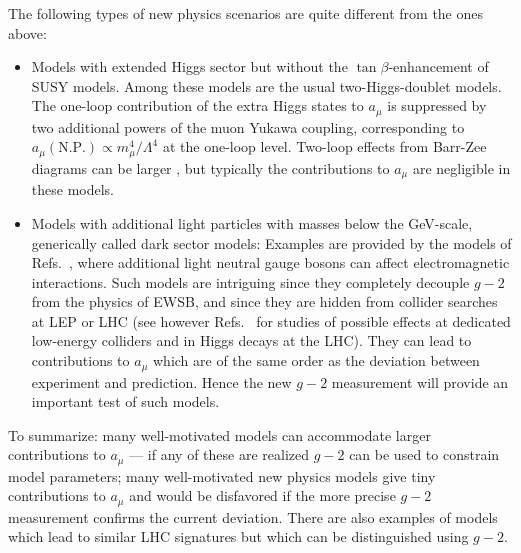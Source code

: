 %
The following types of new physics scenarios are quite different from
the ones above:
\begin{itemize}
\item Models with extended Higgs sector but without the
  $\tan\beta$-enhancement of SUSY models. Among these models are the
  usual two-Higgs-doublet models. The one-loop contribution
  of the extra Higgs states to $a_\mu$ is suppressed by two additional powers of
  the muon Yukawa coupling, corresponding to $a_\mu(\mbox{N.P.})\propto
  m_\mu^4/\Lambda^4$ at the one-loop level. Two-loop effects from
  Barr-Zee diagrams can be larger \cite{Krawczyk:2002df}, but typically the
  contributions to   $a_\mu$ are negligible in these models.
\item Models with additional light particles with masses below the
  GeV-scale, generically called dark sector models: Examples are
  provided by the  models of   Refs.\
  \cite{Pospelov:2008zw,Davoudiasl:2012qa}, where additional light
  neutral gauge bosons can affect electromagnetic interactions. Such
  models are intriguing since 
  they completely decouple $g-2$ from the physics of EWSB, and since
  they are hidden from collider searches at LEP or LHC (see however
  Refs.\ \cite{Essig:2009nc,Davoudiasl:2012ig} for studies of possible
  effects at dedicated low-energy colliders and in Higgs decays at the
  LHC). They can lead to
  contributions to $a_\mu$ which are of the same order as the deviation
  between experiment and prediction. Hence the new $g-2$ measurement will provide
  an important test of such models.
\end{itemize}
To summarize:
many well-motivated models can accommodate larger contributions to
$a_\mu$ --- if any of these are realized $g-2$ can be used to constrain
model parameters; many well-motivated new physics models
give tiny contributions to $a_\mu$ and would be disfavored if the
more precise $g-2$ measurement confirms the current deviation. There are also examples of models which lead to
similar LHC signatures but which can be distinguished using $g-2$.


